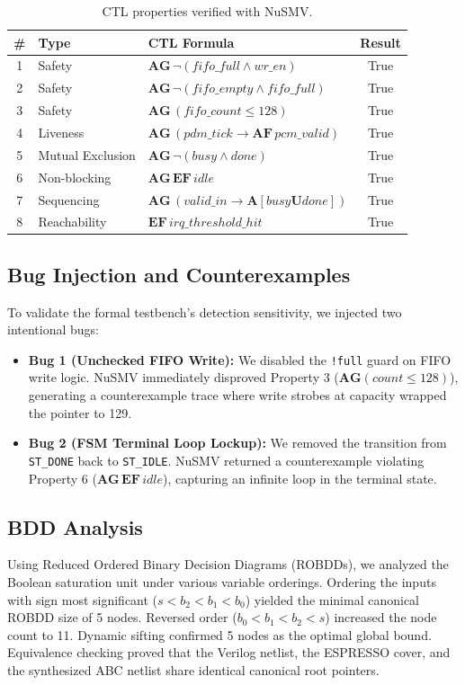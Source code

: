 \documentclass[11pt,a4paper]{article}
\begin{document}
\begin{table}[H]\centering\small
\caption{CTL properties verified with NuSMV.}\label{tab:ctl}
\begin{tabularx}{\linewidth}{@{}clXc@{}}
\toprule
\# & Type & CTL Formula & Result\\
\midrule
1 & Safety & $\mathbf{AG}\,\neg(\mathit{fifo\_full} \land \mathit{wr\_en})$ & True\\
2 & Safety & $\mathbf{AG}\,\neg(\mathit{fifo\_empty} \land \mathit{fifo\_full})$ & True\\
3 & Safety & $\mathbf{AG}\,(\mathit{fifo\_count} \le 128)$ & True\\
4 & Liveness & $\mathbf{AG}\,(\mathit{pdm\_tick} \rightarrow \mathbf{AF}\,\mathit{pcm\_valid})$ & True\\
5 & Mutual Exclusion & $\mathbf{AG}\,\neg(\mathit{busy} \land \mathit{done})$ & True\\
6 & Non-blocking & $\mathbf{AG}\,\mathbf{EF}\,\mathit{idle}$ & True\\
7 & Sequencing & $\mathbf{AG}\,(\mathit{valid\_in} \rightarrow \mathbf{A}[\mathit{busy} \mathbin{\mathbf{U}} \mathit{done}])$ & True\\
8 & Reachability & $\mathbf{EF}\,\mathit{irq\_threshold\_hit}$ & True\\
\bottomrule
\end{tabularx}
\end{table}

\subsection{Bug Injection and Counterexamples}
To validate the formal testbench's detection sensitivity, we injected two intentional bugs:
\begin{itemize}
  \item \textbf{Bug 1 (Unchecked FIFO Write):} We disabled the \texttt{!full} guard on FIFO write logic. NuSMV immediately disproved Property 3 ($\mathbf{AG}(\mathit{count} \le 128)$), generating a counterexample trace where write strobes at capacity wrapped the pointer to 129.
  \item \textbf{Bug 2 (FSM Terminal Loop Lockup):} We removed the transition from \texttt{ST\_DONE} back to \texttt{ST\_IDLE}. NuSMV returned a counterexample violating Property 6 ($\mathbf{AG}\,\mathbf{EF}\,\mathit{idle}$), capturing an infinite loop in the terminal state.
\end{itemize}

\subsection{BDD Analysis}
Using Reduced Ordered Binary Decision Diagrams (ROBDDs), we analyzed the Boolean saturation unit under various variable orderings. Ordering the inputs with sign most significant ($s < b_2 < b_1 < b_0$) yielded the minimal canonical ROBDD size of 5 nodes. Reversed order ($b_0 < b_1 < b_2 < s$) increased the node count to 11. Dynamic sifting confirmed 5 nodes as the optimal global bound. Equivalence checking proved that the Verilog netlist, the ESPRESSO cover, and the synthesized ABC netlist share identical canonical root pointers.
\end{document}
